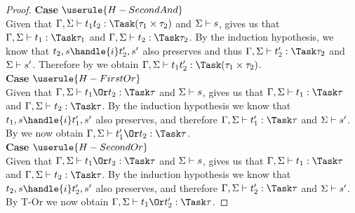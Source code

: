 \begin{proof}
  \noindent\textbf{Case} $\userule{H-SecondAnd}$ \\
  \indent Given that
  $\Gamma,\Sigma\infers t_1\And t_2:\Task(\tau_1\times\tau_2)$ and
  $\Sigma\vdash s$,  gives us that
  $\Gamma,\Sigma\infers t_1:\Task\tau_1$ and
  $\Gamma,\Sigma\infers t_2:\Task\tau_2$. By the induction hypothesis, we know
  that $t_2,s\handle{i}t_2',s'$ also preserves and thus
  $\Gamma,\Sigma\infers t_2':\Task\tau_2$ and $\Sigma\vdash s'$. Therefore by
   we obtain
  $\Gamma,\Sigma\infers t_1\And t_2':\Task(\tau_1\times\tau_2)$.\\

  \noindent\textbf{Case} $\userule{H-FirstOr}$\\
  \indent  Given that
  $\Gamma,\Sigma\infers t_1\Or t_2:\Task\tau$ and $\Sigma\vdash s$,
   gives us that $\Gamma,\Sigma\infers t_1:\Task\tau$ and
  $\Gamma,\Sigma\infers t_2:\Task\tau$. By the induction hypothesis we know that
  $t_1,s\handle{i}t_1',s'$ also preserves, and therefore
  $\Gamma,\Sigma\infers t_1':\Task\tau$ and $\Sigma\vdash s'$. By
   we now obtain $\Gamma,\Sigma\infers t_1'\Or t_2:\Task\tau$.\\

  \noindent\textbf{Case} $\userule{H-SecondOr}$\\
  \indent  Given that
  $\Gamma,\Sigma\infers t_1\Or t_2:\Task\tau$ and $\Sigma\vdash s$,
   gives us that $\Gamma,\Sigma\infers t_1:\Task\tau$ and
  $\Gamma,\Sigma\infers t_2:\Task\tau$. By the induction hypothesis we know that
  $t_2,s\handle{i}t_2',s'$ also preserves, and therefore
  $\Gamma,\Sigma\infers t_2':\Task\tau$ and $\Sigma\vdash s'$. By T-Or we now
  obtain $\Gamma,\Sigma\infers t_1\Or t_2':\Task\tau$.

\end{proof}

